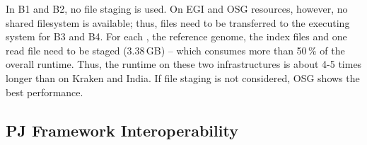 \documentclass{sig-alternate}
\begin{document}
In B1 and B2, no file staging is used. On EGI and OSG resources, however, no
shared filesystem is available; thus, files need to be transferred to the
executing system for B3 and B4. For each \cu, the reference genome, the
index files and one read file need to be staged (3.38\,GB) -- which consumes
more than 50\,\% of the overall runtime. Thus, the runtime on these two
infrastructures is about 4-5 times longer than on Kraken and India. If file
staging is not considered, OSG shows the best performance.  










\subsection{PJ Framework Interoperability}
\label{sec:experiment-interop}
\end{document}
